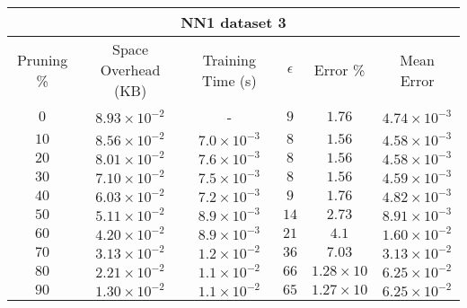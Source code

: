\begin{adjustwidth}{0cm}{}
\begin{tabular}{cccccc}
\hline
\multicolumn{6}{c}{NN1 dataset 3} \\
\toprule
Pruning \% & Space Overhead (KB) & Training Time (s) & $\epsilon$ & Error \% & Mean Error\\
\midrule
$0$ & $8.93 \times 10^{-2}$ & - & $9$ & $1.76$ & $4.74 \times 10^{-3}$\\
$10$ & $8.56 \times 10^{-2}$ & $7.0 \times 10^{-3}$ & $8$ & $1.56$ & $4.58 \times 10^{-3}$\\
$20$ & $8.01 \times 10^{-2}$ & $7.6 \times 10^{-3}$ & $8$ & $1.56$ & $4.58 \times 10^{-3}$\\
$30$ & $7.10 \times 10^{-2}$ & $7.5 \times 10^{-3}$ & $8$ & $1.56$ & $4.59 \times 10^{-3}$\\
$40$ & $6.03 \times 10^{-2}$ & $7.2 \times 10^{-3}$ & $9$ & $1.76$ & $4.82 \times 10^{-3}$\\
$50$ & $5.11 \times 10^{-2}$ & $8.9 \times 10^{-3}$ & $14$ & $2.73$ & $8.91 \times 10^{-3}$\\
$60$ & $4.20 \times 10^{-2}$ & $8.9 \times 10^{-3}$ & $21$ & $4.1$ & $1.60 \times 10^{-2}$\\
$70$ & $3.13 \times 10^{-2}$ & $1.2 \times 10^{-2}$ & $36$ & $7.03$ & $3.13 \times 10^{-2}$\\
$80$ & $2.21 \times 10^{-2}$ & $1.1 \times 10^{-2}$ & $66$ & $1.28 \times 10$ & $6.25 \times 10^{-2}$\\
$90$ & $1.30 \times 10^{-2}$ & $1.1 \times 10^{-2}$ & $65$ & $1.27 \times 10$ & $6.25 \times 10^{-2}$\\
\bottomrule
\end{tabular}
\end{adjustwidth}

\par\null\par

